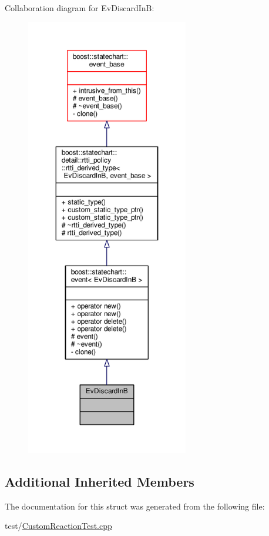 Collaboration diagram for Ev\+Discard\+InB\+:
\nopagebreak
\begin{figure}[H]
\begin{center}
\leavevmode
\includegraphics[height=550pt]{struct_ev_discard_in_b__coll__graph}
\end{center}
\end{figure}
\subsection*{Additional Inherited Members}


The documentation for this struct was generated from the following file\+:\begin{DoxyCompactItemize}
\item 
test/\mbox{\hyperlink{_custom_reaction_test_8cpp}{Custom\+Reaction\+Test.\+cpp}}\end{DoxyCompactItemize}
